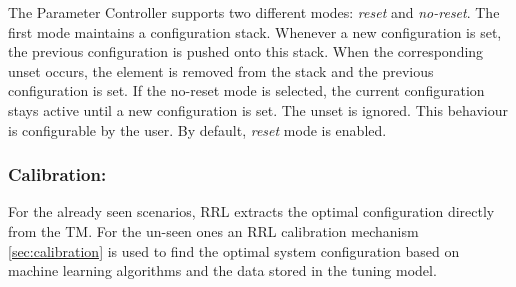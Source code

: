 The Parameter Controller supports two different modes: \textit{reset} and \textit{no-reset}. The first mode maintains a configuration stack. Whenever a new configuration is set, the previous configuration is pushed onto this stack. When the corresponding unset occurs, the element is removed from the stack and the previous configuration is set. If the no-reset mode is selected, the current configuration stays active until a new configuration is set. The unset is ignored. This behaviour is configurable by the user. By default, \textit{reset} mode is enabled.

\subsubsection{Calibration:} For the already seen scenarios, RRL extracts the optimal configuration directly from the TM. For the un-seen ones an RRL calibration mechanism \ref{sec:calibration} is used to find the optimal system configuration based on machine learning algorithms and the data stored in the tuning model. 

 